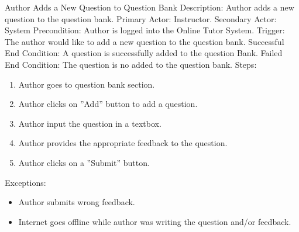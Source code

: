     \begin{section}{Author Adds a New Question to Question Bank}
      Description: Author adds a new question to the question bank. \newline
        Primary Actor: Instructor.  \newline
        Secondary Actor: System  \newline
        Precondition: Author is logged into the Online Tutor System. \newline
        Trigger: The author would like to add a new question to the question bank. \newline
        Successful End Condition: A question is successfully added to the question Bank. \newline
        Failed End Condition: The question is no added to the question bank.
   \newline
        \newline
        Steps:
        \begin{enumerate}
            \item{Author goes to question bank section.}
            \item{Author clicks on ''Add'' button to add a question.}
            \item{Author input the question in a textbox.}
		\item{Author provides the appropriate feedback to the question.}
		\item{Author clicks on a ''Submit'' button.}
        \end{enumerate}
        Exceptions:
        \begin{itemize}
            \item{Author submits wrong feedback.}
	    \item{Internet goes offline while author was writing the question and/or feedback.}
        \end{itemize}
    \end{section}
    
    
    
